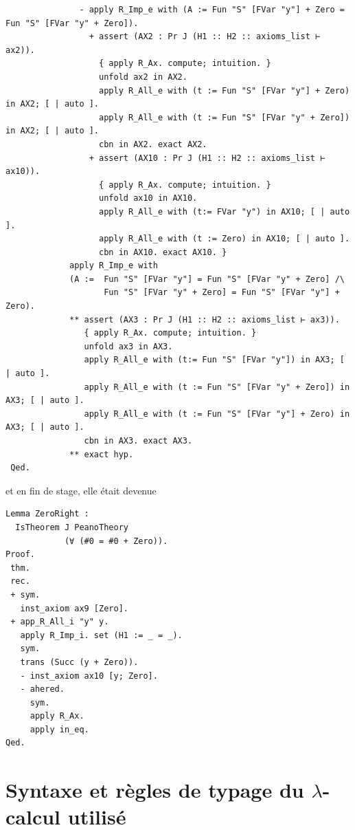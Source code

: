 \documentclass[a4paper]{article}
\theoremstyle{remark}
\theoremstyle{remark}
\theoremstyle{remark}
\theoremstyle{definition}
\theoremstyle{definition}
\theoremstyle{definition}
\begin{document}
\begin{verbatim}
               - apply R_Imp_e with (A := Fun "S" [FVar "y"] + Zero = Fun "S" [FVar "y" + Zero]).
                 + assert (AX2 : Pr J (H1 :: H2 :: axioms_list ⊢ ax2)).
                   { apply R_Ax. compute; intuition. }
                   unfold ax2 in AX2.
                   apply R_All_e with (t := Fun "S" [FVar "y"] + Zero) in AX2; [ | auto ].
                   apply R_All_e with (t := Fun "S" [FVar "y" + Zero]) in AX2; [ | auto ].
                   cbn in AX2. exact AX2.
                 + assert (AX10 : Pr J (H1 :: H2 :: axioms_list ⊢ ax10)).
                   { apply R_Ax. compute; intuition. }
                   unfold ax10 in AX10.
                   apply R_All_e with (t:= FVar "y") in AX10; [ | auto ].
                   apply R_All_e with (t := Zero) in AX10; [ | auto ].
                   cbn in AX10. exact AX10. }
             apply R_Imp_e with
             (A :=  Fun "S" [FVar "y"] = Fun "S" [FVar "y" + Zero] /\
                    Fun "S" [FVar "y" + Zero] = Fun "S" [FVar "y"] + Zero).
             ** assert (AX3 : Pr J (H1 :: H2 :: axioms_list ⊢ ax3)).
                { apply R_Ax. compute; intuition. }
                unfold ax3 in AX3.
                apply R_All_e with (t:= Fun "S" [FVar "y"]) in AX3; [ | auto ].
                apply R_All_e with (t := Fun "S" [FVar "y" + Zero]) in AX3; [ | auto ].
                apply R_All_e with (t := Fun "S" [FVar "y"] + Zero) in AX3; [ | auto ].
                cbn in AX3. exact AX3.
             ** exact hyp.
 Qed.    
\end{verbatim}
et en fin de stage, elle était devenue
\begin{verbatim}
Lemma ZeroRight :
  IsTheorem J PeanoTheory
            (∀ (#0 = #0 + Zero)).
Proof.
 thm.
 rec.
 + sym.
   inst_axiom ax9 [Zero].
 + app_R_All_i "y" y.
   apply R_Imp_i. set (H1 := _ = _).
   sym.
   trans (Succ (y + Zero)).
   - inst_axiom ax10 [y; Zero].
   - ahered.
     sym.
     apply R_Ax.
     apply in_eq.
Qed.
\end{verbatim}

\section{Syntaxe et règles de typage du $\lambda$-calcul utilisé} \label{lambda}
\end{document}
